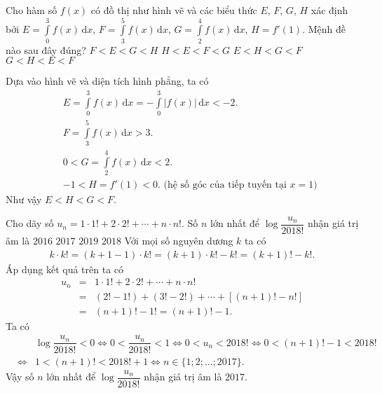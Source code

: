 \begin{ex}%
 \immini
 {
 Cho hàm số $f(x)$ có đồ thị như hình vẽ và các biểu thức $E$, $F$, $G$, $H$ xác định bởi $E=\displaystyle\int\limits_0^3 f(x)\mathrm{\,d}x$, $F=\displaystyle\int\limits_3^5 f(x)\mathrm{\,d}x$, $G=\displaystyle\int\limits_2^4 f(x)\mathrm{\,d}x$, $H=f'(1)$. Mệnh đề nào sau đây đúng?
 \choice
  {$F<E<G<H$}
  {$H<E<F<G$}
  {\True $E<H<G<F$}
  {$G<H<E<F$}
 }
 {
 }
 \loigiai
  {
  Dựa vào hình vẽ và diện tích hình phẳng, ta có
  \begin{eqnarray*}
   & & E = \displaystyle\int\limits_0^3 f(x)\mathrm{\,d}x = - \displaystyle\int\limits_0^3 |f(x)|\mathrm{\,d}x < -2. \\
   & & F = \displaystyle\int\limits_3^5 f(x)\mathrm{\,d}x > 3.\\
   & & 0< G = \displaystyle\int\limits_2^4 f(x)\mathrm{\,d}x <2.\\
   & & -1< H = f'(1) <0. \text{ (hệ số góc của tiếp tuyến tại $x = 1$)}
  \end{eqnarray*}
  Như vậy $E<H<G<F$.
  }
\end{ex}


\begin{ex}%
 Cho dãy số $u_n = 1\cdot 1! + 2\cdot 2! + \cdots + n\cdot n!$. Số $n$ lớn nhất để $\log\dfrac{u_n}{2018!}$ nhận giá trị âm là
 \choice
  {$2016$}
  {\True $2017$}
  {$2019$}
  {$2018$}
 \loigiai
  {
  Với mọi số nguyên dương $k$ ta có
  \begin{eqnarray*}
   k \cdot k! = (k+1-1) \cdot k! = (k+1) \cdot k! - k! = (k+1)! - k!.
  \end{eqnarray*}
  Áp dụng kết quả trên ta có
  \allowdisplaybreaks
  \begin{eqnarray*}
   u_n &=& 1\cdot 1! + 2\cdot 2! + \cdots + n\cdot n! \\
   &=& (2! - 1!) + (3! - 2!) + \cdots + \left[ (n+1)! - n! \right]\\
   &=& (n+1)! - 1! = (n+1)!-1.
  \end{eqnarray*}
  Ta có
  \begin{eqnarray*}
   & & \log\dfrac{u_n}{2018!} < 0 \Leftrightarrow 0 < \dfrac{u_n}{2018!} < 1 \Leftrightarrow 0 < u_n < 2018! \Leftrightarrow 0 < (n+1)! - 1 < 2018!\\
   &\Leftrightarrow & 1 < (n+1)! <2018! + 1 \Leftrightarrow n \in \{1;2;\ldots;2017\}.
  \end{eqnarray*}
  Vậy số $n$ lớn nhất để $\log\dfrac{u_n}{2018!}$ nhận giá trị âm là $2017$.
  }
\end{ex}


